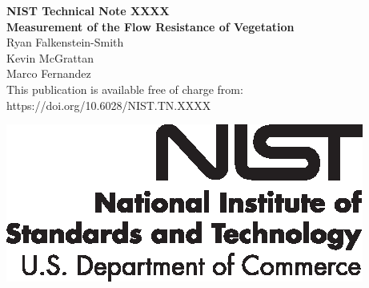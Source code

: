 \documentclass[12pt]{article}
\newcommand{\pubnumber}{XXXX}
\newcommand{\DOI}{https://doi.org/10.6028/NIST.TN.XXXX}
\begin{document}
	
	\begin{titlepage}
		\begin{flushright}
\LARGE{\textbf{NIST Technical Note \pubnumber}}\\
\vfill
\Huge{\textbf{Measurement of the Flow Resistance of Vegetation}}\\
\vfill
\large Ryan Falkenstein-Smith\\
\large Kevin McGrattan\\
\large Marco Fernandez \\
\vfill
\normalsize This publication is available free of charge from:\\
\DOI\\
\vfill

\includegraphics[width=0.3\linewidth]{NIST-logo.eps}\\


\end{flushright}
\end{titlepage}
\end{document}
